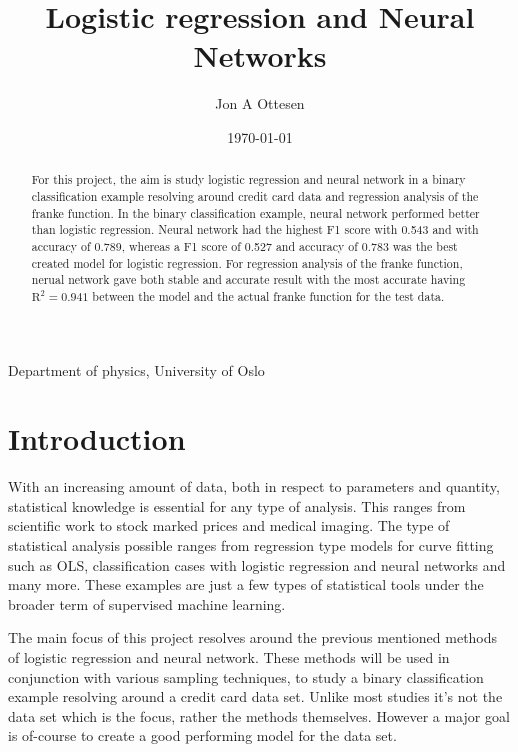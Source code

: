 \documentclass[uio,jmp,amsmath,amssymb,reprint,nofootinbib]{revtex4-1}
\numberwithin{equation}{section}
\begin{document}
\title{Logistic regression and Neural Networks}%

\author{Jon A Ottesen}
{Department of physics, University of Oslo}%
\date{\today}

\begin{abstract}
For this project, the aim is study logistic regression and neural network in a binary classification example resolving around credit card data and regression analysis of the franke function. In the binary classification example, neural network performed better than logistic regression. Neural network had the highest F1 score with 0.543 and with accuracy of 0.789, whereas a F1 score of 0.527 and accuracy of 0.783 was the best created model for logistic regression. For regression analysis of the franke function, nerual network gave both stable and accurate result with the most accurate having \(\text{R}^2=0.941\) between the model and the actual franke function for the test data. 
\end{abstract}

\maketitle


\section{Introduction}\label{sec:Introduction}

With an increasing amount of data, both in respect to parameters and quantity, statistical knowledge is essential for any type of analysis. This ranges from scientific work to stock marked prices and medical imaging. The type of statistical analysis possible ranges from regression type models for curve fitting such as OLS, classification cases with logistic regression and neural networks and many more. These examples are just a few types of statistical tools under the broader term of supervised machine learning.

The main focus of this project resolves around the previous mentioned methods of logistic regression and neural network. These methods will be used in conjunction with various sampling techniques, to study a binary classification example resolving around a credit card data set. Unlike most studies it's not the data set which is the focus, rather the methods themselves. However a major goal is of-course to create a good performing model for the data set.
\end{document}
